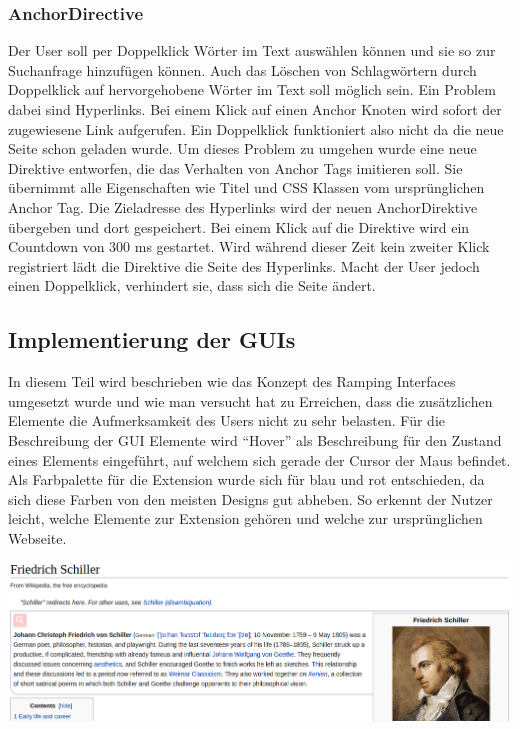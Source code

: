   \subsubsection{AnchorDirective}
  Der User soll per Doppelklick Wörter im Text auswählen können und sie so zur Suchanfrage hinzufügen können. Auch das Löschen von Schlagwörtern durch Doppelklick auf hervorgehobene Wörter im Text soll möglich sein. Ein Problem dabei sind Hyperlinks. Bei einem Klick auf einen Anchor Knoten wird sofort der zugewiesene Link aufgerufen. Ein Doppelklick funktioniert also nicht da die neue Seite schon geladen wurde. Um dieses Problem zu umgehen wurde eine neue Direktive entworfen, die das Verhalten von Anchor Tags imitieren soll. Sie übernimmt alle Eigenschaften wie Titel und CSS Klassen vom ursprünglichen Anchor Tag. Die Zieladresse des Hyperlinks wird der neuen AnchorDirektive übergeben und dort gespeichert. Bei einem Klick auf die Direktive wird ein Countdown von 300 ms gestartet. Wird während dieser Zeit kein zweiter Klick registriert lädt die Direktive die Seite des Hyperlinks. Macht der User jedoch einen Doppelklick, verhindert sie, dass sich die Seite ändert.

 \subsection{Implementierung der GUIs}
 In diesem Teil wird beschrieben wie das Konzept des Ramping Interfaces umgesetzt wurde und wie man versucht hat zu Erreichen, dass die zusätzlichen Elemente die Aufmerksamkeit des Users nicht zu sehr belasten. Für die Beschreibung der GUI Elemente wird ``Hover'' als Beschreibung für den Zustand eines Elements eingeführt, auf welchem sich gerade der Cursor der Maus befindet. Als Farbpalette für die Extension wurde sich für blau und rot entschieden, da sich diese Farben von den meisten Designs gut abheben. So erkennt der Nutzer leicht, welche Elemente zur Extension gehören und welche zur ursprünglichen Webseite. 
 
 \begin{minipage}{\linewidth}
	\centering
	\vspace*{0.5cm}
	\includegraphics[width=\linewidth]{Bilder/app-screenshots/paragraph-unhovered.png}
	\label{fig:paragraph}
	\vspace*{0.5cm}
 \end{minipage}

